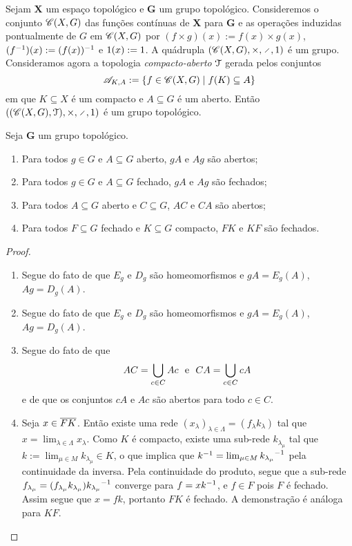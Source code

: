 \begin{example}
Sejam $\bm X$ um espaço topológico e $\bm G$ um grupo topológico. Consideremos o conjunto $\mathscr{C}(X,G)$ das funções contínuas de $\bm X$ para $\bm G$ e as operações induzidas pontualmente de $G$ em $\mathscr{C}(X,G)$ por $(f \times g)(x) := f(x) \times g(x)$, $(f^{-1})(x) := (f(x))^{-1}$ e $1(x) := 1$. A quádrupla $(\Cont(X,G),\times,\div,\id)$ é um grupo. Consideramos agora a topologia \emph{compacto-aberto} $\mathcal{T}$ gerada pelos conjuntos
	\begin{equation*}
	\mathscr A_{K,A} := \left\{{f \in \mathscr{C}(X,G)}\;\middle\vert\;{f(K) \subseteq A}\right\}
	\end{equation*}
em que $K \subseteq X$ é um compacto e $A \subseteq G$ é um aberto. Então $((\Cont(X,G),\topo),\times,\div,\id)$ é um grupo topológico.
\end{example}

\begin{proposition}
Seja $\bm G$ um grupo topológico.
	\begin{enumerate}
	\item Para todos $g \in G$ e $A \subseteq G$ aberto, $gA$ e $Ag$ são abertos;
	\item Para todos $g \in G$ e $A \subseteq G$ fechado, $gA$ e $Ag$ são fechados;
	\item Para todos $A \subseteq G$ aberto e $C \subseteq G$, $AC$ e $CA$ são abertos;
	\item Para todos $F \subseteq G$ fechado e $K \subseteq G$ compacto, $FK$ e $KF$ são fechados.
	\end{enumerate}
\end{proposition}
\begin{proof}
	\begin{enumerate}
	\item Segue do fato de que $E_g$ e $D_g$ são homeomorfismos e $gA = E_g(A)$, $Ag = D_g(A)$.
	\item Segue do fato de que $E_g$ e $D_g$ são homeomorfismos e $gA = E_g(A)$, $Ag = D_g(A)$.
	\item Segue do fato de que
		\begin{equation*}
		AC = \bigcup_{c \in C} Ac \text{\ \ e\ \ } CA = \bigcup_{c \in C} cA
		\end{equation*}
e de que os conjuntos $cA$ e $Ac$ são abertos para todo $c \in C$.
	\item Seja $x \in \overline{FK}$. Então existe uma rede $(x_\lambda)_{\lambda \in \Lambda} = (f_\lambda k_\lambda)$ tal que $x = \lim_{\lambda \in \Lambda} x_\lambda$. Como $K$ é compacto, existe uma sub-rede $k_{\lambda_\mu}$ tal que $k := \lim_{\mu \in M} k_{\lambda_\mu} \in K$, o que implica que $k^{-1} = \lim_{\mu \in M} {k_{\lambda_\mu}}^{-1}$ pela continuidade da inversa. Pela continuidade do produto, segue que a sub-rede $f_{\lambda_\mu} = (f_{\lambda_\mu}k_{\lambda_\mu}){k_{\lambda_\mu}}^{-1}$ converge para $f = xk^{-1}$, e $f \in F$ pois $F$ é fechado. Assim segue que $x=fk$, portanto $FK$ é fechado. A demonstração é análoga para $KF$.
	\end{enumerate}
\end{proof}

